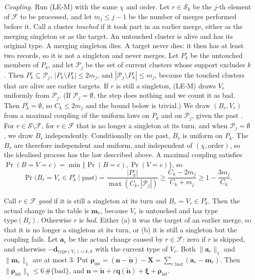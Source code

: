 \emph{Coupling.} Run (LE-M) with the same $\chi$ and order. Let $r\in\mathcal S_k$ be the $j$-th element of $\mathcal F$ to be processed, and let $m_j\le j-1$ be the number of merges performed before it. Call a cluster \emph{touched} if it took part in an earlier merge, either as the merging singleton or as the target. An untouched cluster is alive and has its original type. A merging singleton dies. A target never dies: it then has at least two records, so it is not a singleton and never merges. Let $P_k^\circ$ be the untouched members of $P_k$, and let $\mathcal P_j$ be the set of current clusters whose support excludes $k$. Then $P_k^\circ\subseteq\mathcal P_j$, $|P_k\setminus P_k^\circ|\le2m_j$, and $|\mathcal P_j\setminus P_k^\circ|\le m_j$, because the touched clusters that are alive are earlier targets. If $r$ is still a singleton, (LE-M) draws $V_r$ uniformly from $\mathcal P_j$. (If $\mathcal P_j=\emptyset$, the step does nothing and we count it as bad. Then $P_k^\circ=\emptyset$, so $C_k\le2m_j$ and the bound below is trivial.) We draw $(B_r,V_r)$ from a maximal coupling of the uniform laws on $P_k$ and on $\mathcal P_j$, given the past \citep{lindvall1992}. For $r\in\mathcal S\setminus\mathcal F$, for $r\in\mathcal F$ that is no longer a singleton at its turn, and when $\mathcal P_j=\emptyset$, we draw $B_r$ independently. Conditionally on the past, $B_r$ is uniform on $P_k$. The $B_r$ are therefore independent and uniform, and independent of $(\chi,\text{order})$, so the idealised process has the law described above. A maximal coupling satisfies $\Pr(B=V=c)=\min\{\Pr(B=c),\Pr(V=c)\}$, so
\[
  \Pr\bigl(B_r=V_r\in P_k^\circ\mid\text{past}\bigr)=\frac{|P_k^\circ|}{\max(C_k,|\mathcal P_j|)}\ge\frac{C_k-2m_j}{C_k+m_j}\ge1-\frac{3m_j}{C_k}.
\]

Call $r\in\mathcal F$ \emph{good} if it is still a singleton at its turn and $B_r=V_r\in P_k^\circ$. Then the actual change in the table is $\bm m_r$, because $V_r$ is untouched and has type $\mathrm{type}(B_r)$. Otherwise $r$ is \emph{bad}. Either (a) it was the target of an earlier merge, so that it is no longer a singleton at its turn, or (b) it is still a singleton but the coupling fails. Let $\bm a_r$ be the actual change caused by $r\in\mathcal F$: zero if $r$ is skipped, and otherwise $-\bm d_{\mathrm{type}(V_r)\cup k,k}$ with the current type of $V_r$. Both $\|\bm a_r\|_1$ and $\|\bm m_r\|_1$ are at most $3$. Put $\bm\rho_{\mathrm{int}}=(\bm n-\tilde{\bm n})-\bm X=\sum_{r\text{ bad}}(\bm a_r-\bm m_r)$. Then $\|\bm\rho_{\mathrm{int}}\|_1\le6\,\#\{\text{bad}\}$, and $\bm n=\tilde{\bm n}+\varepsilon\bm q(\tilde{\bm n})+\bm\xi+\bm\rho_{\mathrm{int}}$.

